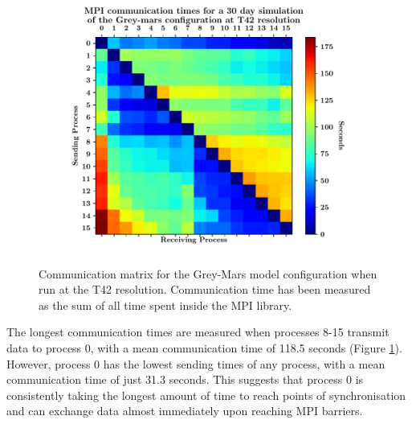 \documentclass[a4paper,11pt]{report}
\begin{document}
\begin{figure}[htbp]
\begin{center}
\includegraphics[width=1\textwidth]{img/comm_mat_grey-mars.pdf}
\caption[Communication matrix for the Grey-Mars model configuration]{Communication matrix for the Grey-Mars model configuration when run at the T42 resolution. Communication time has been measured as the sum of all time spent inside the MPI library.}
\label{fig:comm_mat}
\end{center}
\end{figure}
\par
The longest communication times are measured when processes 8-15 transmit data to process 0, with a mean communication time of 118.5 seconds (Figure \ref{fig:comm_mat}). However, process 0 has the lowest sending times of any process, with a mean communication time of just 31.3 seconds. This suggests that process 0 is consistently taking the longest amount of time to reach points of synchronisation and can exchange data almost immediately upon reaching MPI barriers. 
\end{document}
